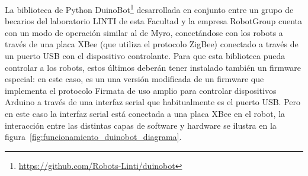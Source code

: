 La biblioteca de Python
DuinoBot\footnote{\url{https://github.com/Robots-Linti/duinobot}}
desarrollada en conjunto entre un grupo
de becarios del laboratorio LINTI de esta Facultad y la empresa RobotGroup
cuenta con un modo de operación similar al de Myro, conectándose con
los robots a través de una placa XBee (que utiliza el protocolo ZigBee)
conectado a través de un puerto USB con el dispositivo controlante.
Para que esta biblioteca pueda controlar a los robots, estos últimos
deberán tener instalado también un firmware especial: en este caso,
es un una versión modificada de un firmware que implementa el protocolo
Firmata de uso amplio para controlar dispositivos Arduino a través de una
interfaz serial que habitualmente es el puerto USB. Pero en este caso
la interfaz serial está conectada a una placa XBee en el robot,
la interacción
entre las distintas capas de software y hardware se ilustra en la
figura~\ref{fig:funcionamiento_duinobot_diagrama}.

